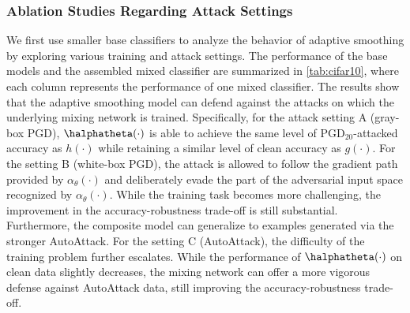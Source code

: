 \documentclass[11pt, letterpaper]{article}
\theoremstyle{plain}
\theoremstyle{definition}
\begin{document}
\subsubsection{Ablation Studies Regarding Attack Settings} \label{sec:adap_exp_abla}

We first use smaller base classifiers to analyze the behavior of adaptive smoothing by exploring various training and attack settings. The performance of the base models and the assembled mixed classifier are summarized in \cref{tab:cifar10}, where each column represents the performance of one mixed classifier. The results show that the adaptive smoothing model can defend against the attacks on which the underlying mixing network is trained.
Specifically, for the attack setting A (gray-box PGD), $\halphatheta(\cdot)$ is able to achieve the same level of PGD$_{20}$-attacked accuracy as $h (\cdot)$ while retaining a similar level of clean accuracy as $g (\cdot)$.
For the setting B (white-box PGD), the attack is allowed to follow the gradient path provided by $\alpha_\theta (\cdot)$ and deliberately evade the part of the adversarial input space recognized by $\alpha_\theta (\cdot)$. While the training task becomes more challenging, the improvement in the accuracy-robustness trade-off is still substantial. Furthermore, the composite model can generalize to examples generated via the stronger AutoAttack.
For the setting C (AutoAttack), the difficulty of the training problem further escalates. While the performance of $\halphatheta (\cdot)$ on clean data slightly decreases, the mixing network can offer a more vigorous defense against AutoAttack data, still improving the accuracy-robustness trade-off.
\end{document}
